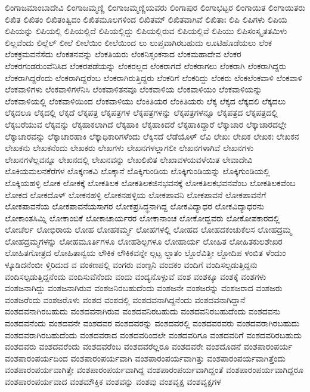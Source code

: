 {ಲಿಂಗಾಜಮಾಂಬಾದೇವಿ
ಲಿಂಗಾಜಮ್ಮಣ್ಣಿ
ಲಿಂಗಾಜಮ್ಮಣ್ಣಿಯವರು
ಲಿಂಗಾಪುರ
ಲಿಂಗಾಭಟ್ಟರ
ಲಿಂಗಾಯಿತ
ಲಿಂಗಾಯಿತರು
ಲಿಖಿತ
ಲಿಖಿತಂ
ಲಿಖಿತಂತ್ವಿದಂ
ಲಿಖಿತಮೂಲಗಳಿಂದ
ಲಿಖಿತಮ್
ಲಿಖಿತವಾಗಿವೆ
ಲಿಖಿತಾಃ
ಲಿಪಿ
ಲಿಪಿಗಳು
ಲಿಪಿಯ
ಲಿಪಿಯನ್ನು
ಲಿಪಿಯಲ್ಲಿ
ಲಿಪಿಯಲ್ಲಿದೆ
ಲಿಪಿಯಲ್ಲಿದ್ದು
ಲಿಪಿಯಲ್ಲಿರುವ
ಲಿಪಿಯಲ್ಲಿವೆ
ಲಿಪಿಯು
ಲಿಪಿಸಂಸ್ಕೃತತಮಿಳು
ಲಿಲ್ಲವೆಂದು
ಲಿಲ್ಲೆಲ್
ಲೀಲೆ
ಲೀಲೆಯಿಂ
ಲೀಲೆಯಿಂದ
ಲು
ಲುಪ್ತವಾಗಿರಬಹುದು
ಲೂಟಿಹೊಡೆಯಲು
ಲೆಂಕ
ಲೆಂಕಕ್ರಮವನೆಸೆದು
ಲೆಂಕತನವನ್ನು
ಲೆಂಕತಿಯರು
ಲೆಂಕನಿಸ್ಸಂಕನಾದ
ಲೆಂಕಮಹಾದೇವ
ಲೆಂಕರ
ಲೆಂಕರಗಂಡರುಂವೆನಿಸಿದ
ಲೆಂಕರಪಡೆಯನ್ನು
ಲೆಂಕರಲ್ಲದ
ಲೆಂಕರಾಗದೆ
ಲೆಂಕರಾಗಲು
ಲೆಂಕರಾಗಿ
ಲೆಂಕರಾಗಿದ್ದರು
ಲೆಂಕರಾಗಿದ್ದರೆಂದು
ಲೆಂಕರಾಗಿದ್ದರೆಂಬ
ಲೆಂಕರಾಗಿರುತ್ತಿದ್ದರು
ಲೆಂಕರಿಗೆ
ಲೆಂಕರಿದ್ದು
ಲೆಂಕರು
ಲೆಂಕಲೆಂಕವಾಳಿ
ಲೆಂಕವಾಳಿ
ಲೆಂಕವಾಳಿಗಳು
ಲೆಂಕವಾಳಿಗಳೆನಿಸಿ
ಲೆಂಕವಾಳಿತನವೂ
ಲೆಂಕವಾಳಿಯ
ಲೆಂಕವಾಳಿಯಂ
ಲೆಂಕವಾಳಿಯನ್ನು
ಲೆಂಕವಾಳಿಯಲ್ಲಿ
ಲೆಂಕವಾಳಿಯಿಂದ
ಲೆಂಕವಾಳಿಯು
ಲೆಂಕಿತಿಯರ
ಲೆಂಕಿತಿಯರು
ಲೆಕ್ಕ
ಲೆಕ್ಕದ
ಲೆಕ್ಕದಲಿ
ಲೆಕ್ಕದಲು
ಲೆಕ್ಕದಲೂ
ಲೆಕ್ಕದಲ್ಲಿ
ಲೆಕ್ಕದೆ
ಲೆಕ್ಕಪತ್ರ
ಲೆಕ್ಕಪತ್ರಗಳ
ಲೆಕ್ಕಪತ್ರಗಳನ್ನು
ಲೆಕ್ಕಪತ್ರಗಳನ್ನೂ
ಲೆಕ್ಕಪತ್ರದ
ಲೆಕ್ಕಪತ್ರದಲ್ಲಿ
ಲೆಕ್ಕಬರೆಯುವ
ಲೆಕ್ಕವನ್ನು
ಲೆಕ್ಕಹಾಕಲಾಗಿದೆ
ಲೆಕ್ಕಹಾಕಿ
ಲೆಕ್ಕಹಾಕಿದರೆ
ಲೆಕ್ಕಹಾಕಿದ್ದಾರೆ
ಲೆಕ್ಕಾಚಾರ
ಲೆಕ್ಕಾಚಾರದಲ್ಲೇ
ಲೆಕ್ಕಾಚಾರವನ್ನು
ಲೆಕ್ಕಾಚಾರಹಾಕಿ
ಲೆಕ್ಕಾಧಿಕಾರಿಗಳೆಂದು
ಲೆಕ್ಕಿಸದೆ
ಲೆಡೆಯೊಳ್
ಲೆವಿ
ಲೇಖಃ
ಲೇಖಕ
ಲೇಖಕಃ
ಲೇಖಕನ
ಲೇಖಕನು
ಲೇಖಕನೆಂದು
ಲೇಖಕರು
ಲೇಖಗಳು
ಲೇಖನಗಳಲ್ಲಾಗಲೀ
ಲೇಖನಗಳಾಗಿವೆ
ಲೇಖನಗಳು
ಲೇಖನಗಳೆಲ್ಲವನ್ನೂ
ಲೇಖನದಲ್ಲಿ
ಲೇಖನವನ್ನು
ಲೇಖಲಿಖಿತ
ಲೇಖಾವಳಯವಳೆಯಿತ
ಲೇವಾದೇವಿ
ಲೊಕಿಯಮಲನಕೆರೆಗಳ
ಲೊಕ್ಕಣಕವಿ
ಲೊಕ್ಕಾನೆ
ಲೊಕ್ಕಿಗುಂಡಿಯ
ಲೊಕ್ಕಿಗುಂಡಿಯನ್ನು
ಲೊಕ್ಕಿಗುಂಡಿಯಲ್ಲಿ
ಲೊಕ್ಕಿಯಹಳ್ಳಿ
ಲೋಕ
ಲೋಕಕ್ಕೆ
ಲೋಕತಿಲಕ
ಲೋಕತಿಲಕಜಿನಭವನಕ್ಕೆ
ಲೋಕತಿಲಕಭವನವೆಂಬ
ಲೋಕತಿಲಕವೆಂಬ
ಲೋಕದ
ಲೋಕದೊಳ್
ಲೋಕನಹಳ್ಳಿ
ಲೋಕನಹಳ್ಳಿಯ
ಲೋಕಪಾವನಿ
ಲೋಕಪಾವನೆ
ಲೋಕಪಾವನೆಗೆ
ಲೋಕಪಾವನೆಯ
ಲೋಕಪಾವನೆಯಸಾಗರ
ಲೋಕಪ್ರಸಿದ್ಧನಾಗಿದ್ದ
ಲೋಕವಿದ್ಯಾಧರ
ಲೋಕವಿದ್ಯಾಧರನು
ಲೋಕಾಂತಸಿಮ್ನಿ
ಲೋಕಾಂಬಿಕೆ
ಲೋಕಾಚಾರ್ಯರರ
ಲೋಕಾನಾಂಚ
ಲೋಕೋದ್ಭವರು
ಲೋಕೋಪಕಾರದಲ್ಲಿ
ಲೋಚೆರ್ಲ
ಲೋಭಿರಾಯ
ಲೋಹ
ಲೋಹಕರ್ಮ್ಮ
ಲೋಹಗಳಲ್ಲಿ
ಲೋಹದ
ಲೋಹದಕಂಚುಕೆಲಸ
ಲೋಹದ್ರಮ್ಮ
ಲೋಹದ್ರಮ್ಮಗಳನ್ನು
ಲೋಹಮೂರ್ತಿಗಳೂ
ಲೋಹಶಿಲ್ಪಗಳೂ
ಲೋಹಾರ್ಯ
ಲೋಹಿತ
ಲೋಹಿತಕುಲಶೇಖರ
ಲೋಹಿತಗೋತ್ರದ
ಲೋಹಿತಾನ್ವಯ
ಲೌಕಿಕ
ಲೌಕಿಕವನ್ನೇ
ಲ್ಗಟ್ಟ
ಲ್ದಾತಂ
ಲ್ದೊರೆವಿತ್ತೀ
ಲ್ದೋದಿಪ
ಳಂಬಿತ
ಳೆಂದುಂ
ಳ್ಕೂಡಿದನೆಂಬೀ
ಳ್ತಿರಿದುದ
ವ
ವಂಕಣಪಲ್ಲಿ
ವಂಗರು
ವಂಣ್ಪನಿ
ವಂದಕಂ
ವಂದಿಗೆ
ವಂದಿಸಲ್ಪಡುತ್ತಿದ್ದನು
ವಂದಿಸಲ್ಪಡುತ್ತಿದ್ದನೆಂದು
ವಂದಿಸುವೆನೆಂದು
ವಂದು
ವಂದ್ಯನೊಳ್ಪುವೆ
ವಂಶ
ವಂಶಕ್ಕೂ
ವಂಶಕ್ಕೆ
ವಂಶಗಳು
ವಂಶಜನಾಗಿದ್ದು
ವಂಶಜನಾಗಿರುವ
ವಂಶಜನಿರಬಹುದೆಂದು
ವಂಶಜನೇ
ವಂಶಜರನ್ನು
ವಂಶಜರಾದ
ವಂಶಜರು
ವಂಶಜರೆಂದು
ವಂಶಜರೊಳು
ವಂಶದ
ವಂಶದಲ್ಲಿ
ವಂಶದವನಾಗಿದ್ದನೆಂದು
ವಂಶದವನಾಗಿದ್ದಾನೆ
ವಂಶದವನಾಗಿರಬಹುದು
ವಂಶದವನಾಗಿರುವ
ವಂಶದವನಿರಬಹುದು
ವಂಶದವನಿರಬಹುದೆಂದು
ವಂಶದವನು
ವಂಶದವನೆಂದು
ವಂಶದವನೇ
ವಂಶದವರ
ವಂಶದವರನ್ನು
ವಂಶದವರಲ್ಲಿ
ವಂಶದವರವರು
ವಂಶದವರಾಗಿರಬಹುದು
ವಂಶದವರಾಗಿರಬಹುದೆಂದು
ವಂಶದವರಾದ
ವಂಶದವರಿಂದಲೇ
ವಂಶದವರಿಗೂ
ವಂಶದವರಿಗೆ
ವಂಶದವರಿರಬಹುದು
ವಂಶದವರು
ವಂಶದವರೆಂದು
ವಂಶದವರೆಂಬ
ವಂಶದವರೆಲ್ಲರೂ
ವಂಶದವರೇ
ವಂಶದೊಡನೆ
ವಂಶಪಾರಂಪರ್ಯ
ವಂಶಪಾರಂಪರ್ಯದಿಂದ
ವಂಶಪಾರಂಪರ್ಯವಾಗಿ
ವಂಶಪಾರಂಪರ್ಯವಾಗಿತ್ತು
ವಂಶಪಾರಂಪರ್ಯವಾಗಿತ್ತೆಂದು
ವಂಶಪಾರಂಪರ್ಯವಾಗಿತ್ತೇ
ವಂಶಪಾರಂಪರ್ಯವಾಗಿದ್ದ
ವಂಶಪಾರಂಪರ್ಯವಾಗಿದ್ದಂತೆ
ವಂಶಪಾರಂಪರ್ಯವಾಗಿದ್ದರೂ
ವಂಶಪಾರಂಪರ್ಯವಾದ
ವಂಶಮೌಕ್ತಿಕ
ವಂಶವನ್ನು
ವಂಶವು
ವಂಶವೃಕ್ಷ
ವಂಶವೃಕ್ಷಗಳ
}

